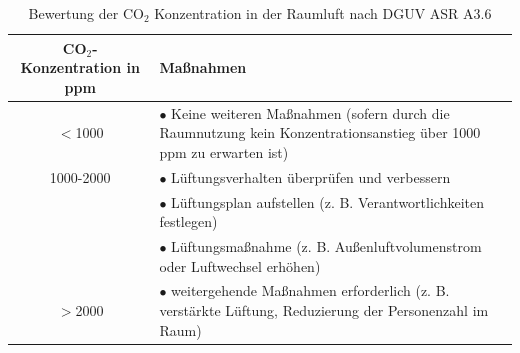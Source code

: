 \documentclass[a4paper,
    11pt,
    headings=small,
    ngerman,
    listof=totoc,
    numbers=noenddot]{scrreprt}[2021/11/13]
\begin{document}
\newpage

\listoffigures
\listoftables
\lstlistoflistings
\printglossary
\printbibliography

\newpage

\appendix
{}

\tableofcontents
\listoffigures
\listoftables
\lstlistoflistings


\begin{table}[htbp]
  \centering
  \renewcommand{\arraystretch}{1.25}
  \caption{Bewertung der CO$_2$ Konzentration in der Raumluft nach \ac{DGUV} \ac{ASR} A3.6 \autocite{ASR}}
  \begin{tabular}{c|p{}}
    CO$_2$-Konzentration in \ac{ppm} & Maßnahmen                                                                                                                  \\
    \hline
    $<$1000                          & $\bullet$ Keine weiteren Maßnahmen (sofern durch die Raumnutzung kein Konzentrationsanstieg über 1000 ppm zu erwarten ist) \\
    \hline
    1000-2000                        & $\bullet$ Lüftungsverhalten überprüfen und verbessern                                                                      \\
                                     & $\bullet$ Lüftungsplan aufstellen (z. B. Verantwortlichkeiten festlegen)                                                   \\
                                     & $\bullet$ Lüftungsmaßnahme (z. B. Außenluftvolumenstrom oder Luftwechsel erhöhen)                                          \\
    \hline
    $>$2000                          & $\bullet$ weitergehende Maßnahmen erforderlich (z. B. verstärkte Lüftung, Reduzierung der Personenzahl im Raum)            \\
  \end{tabular}
  \label{appendix:tab:dguv_table_co2}
\end{table}
\end{document}
